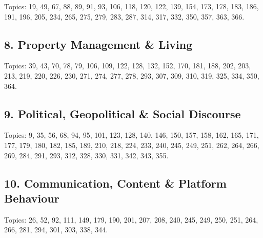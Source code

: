 \documentclass[10pt]{article}
\begin{document}
Topics: 19, 49, 67, 88, 89, 91, 93, 106, 118, 120, 122, 139, 154, 173, 178, 183, 186, 191, 196, 205, 234, 265, 275, 279, 283, 287, 314, 317, 332, 350, 357, 363, 366.

\subsection*{8. Property Management \& Living}

Topics: 39, 43, 70, 78, 79, 106, 109, 122, 128, 132, 152, 170, 181, 188, 202, 203, 213, 219, 220, 226, 230, 271, 274, 277, 278, 293, 307, 309, 310, 319, 325, 334, 350, 364.

\subsection*{9. Political, Geopolitical \& Social Discourse}

Topics: 9, 35, 56, 68, 94, 95, 101, 123, 128, 140, 146, 150, 157, 158, 162, 165, 171, 177, 179, 180, 182, 185, 189, 210, 218, 224, 233, 240, 245, 249, 251, 262, 264, 266, 269, 284, 291, 293, 312, 328, 330, 331, 342, 343, 355.

\subsection*{10. Communication, Content \& Platform Behaviour}

Topics: 26, 52, 92, 111, 149, 179, 190, 201, 207, 208, 240, 245, 249, 250, 251, 264, 266, 281, 294, 301, 303, 338, 344.
\end{document}
